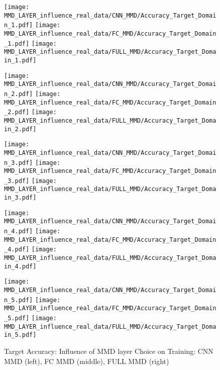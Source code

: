 \begin{figure}[H]
  \centering

  \texttt{[image: MMD\_LAYER\_influence\_real\_data/CNN\_MMD/Accuracy\_Target\_Domain\_1.pdf]}
  \hspace{.1cm}
  \texttt{[image: MMD\_LAYER\_influence\_real\_data/FC\_MMD/Accuracy\_Target\_Domain\_1.pdf]}
  \hspace{.1cm}
  \texttt{[image: MMD\_LAYER\_influence\_real\_data/FULL\_MMD/Accuracy\_Target\_Domain\_1.pdf]}

  \vspace{.3cm}

  \texttt{[image: MMD\_LAYER\_influence\_real\_data/CNN\_MMD/Accuracy\_Target\_Domain\_2.pdf]}
  \hspace{.1cm}
  \texttt{[image: MMD\_LAYER\_influence\_real\_data/FC\_MMD/Accuracy\_Target\_Domain\_2.pdf]}
  \hspace{.1cm}
  \texttt{[image: MMD\_LAYER\_influence\_real\_data/FULL\_MMD/Accuracy\_Target\_Domain\_2.pdf]}

  \vspace{.3cm}

  \texttt{[image: MMD\_LAYER\_influence\_real\_data/CNN\_MMD/Accuracy\_Target\_Domain\_3.pdf]}
  \hspace{.1cm}
  \texttt{[image: MMD\_LAYER\_influence\_real\_data/FC\_MMD/Accuracy\_Target\_Domain\_3.pdf]}
  \hspace{.1cm}
  \texttt{[image: MMD\_LAYER\_influence\_real\_data/FULL\_MMD/Accuracy\_Target\_Domain\_3.pdf]}
  
    \vspace{.3cm}

  \texttt{[image: MMD\_LAYER\_influence\_real\_data/CNN\_MMD/Accuracy\_Target\_Domain\_4.pdf]}
  \hspace{.1cm}
  \texttt{[image: MMD\_LAYER\_influence\_real\_data/FC\_MMD/Accuracy\_Target\_Domain\_4.pdf]}
  \hspace{.1cm}
  \texttt{[image: MMD\_LAYER\_influence\_real\_data/FULL\_MMD/Accuracy\_Target\_Domain\_4.pdf]}
  
    \vspace{.3cm}
    
  \texttt{[image: MMD\_LAYER\_influence\_real\_data/CNN\_MMD/Accuracy\_Target\_Domain\_5.pdf]}
  \hspace{.1cm}
  \texttt{[image: MMD\_LAYER\_influence\_real\_data/FC\_MMD/Accuracy\_Target\_Domain\_5.pdf]}
  \hspace{.1cm}
  \texttt{[image: MMD\_LAYER\_influence\_real\_data/FULL\_MMD/Accuracy\_Target\_Domain\_5.pdf]}


  \caption{Target Accuracy: Influence of MMD layer Choice on Training: CNN MMD (left), FC MMD (middle), FULL MMD (right)}
  \label{fig:target_accuracy_MMD_layer}
\end{figure}


